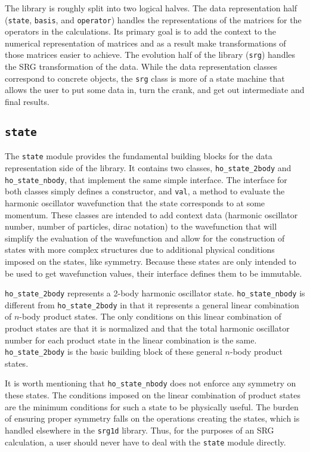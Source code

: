 The library is roughly split into two logical halves. The data representation half (\texttt{state}, \texttt{basis}, and \texttt{operator}) handles the representations of the matrices for the operators in the calculations. Its primary goal is to add the context to the numerical representation of matrices and as a result make transformations of those matrices easier to achieve. The evolution half of the library (\texttt{srg}) handles the SRG transformation of the data. While the data representation classes correspond to concrete objects, the \texttt{srg} class is more of a state machine that allows the user to put some data in, turn the crank, and get out intermediate and final results.

\subsection{\texttt{state}}

The \texttt{state} module provides the fundamental building blocks for the data representation side of the library. It contains two classes, \texttt{ho\_state\_2body} and \texttt{ho\_state\_nbody}, that implement the same simple interface. The interface for both classes simply defines a constructor, and \texttt{val}, a method to evaluate the harmonic oscillator wavefunction that the state corresponds to at some momentum. These classes are intended to add context data (harmonic oscillator number, number of particles, dirac notation) to the wavefunction that will simplify the evaluation of the wavefunction and allow for the construction of states with more complex structures due to additional physical conditions imposed on the states, like symmetry. Because these states are only intended to be used to get wavefunction values, their interface defines them to be immutable.

\texttt{ho\_state\_2body} represents a 2-body harmonic oscillator state. \texttt{ho\_state\_nbody} is different from \texttt{ho\_state\_2body} in that it represents a general linear combination of $n$-body product states. The only conditions on this linear combination of product states are that it is normalized and that the total harmonic oscillator number for each product state in the linear combination is the same. \texttt{ho\_state\_2body} is the basic building block of these general $n$-body product states.

It is worth mentioning that \texttt{ho\_state\_nbody} does not enforce any symmetry on these states. The conditions imposed on the linear combination of product states are the minimum conditions for such a state to be physically useful. The burden of ensuring proper symmetry falls on the operations creating the states, which is handled elsewhere in the \texttt{srg1d} library. Thus, for the purposes of an SRG calculation, a user should never have to deal with the \texttt{state} module directly.

